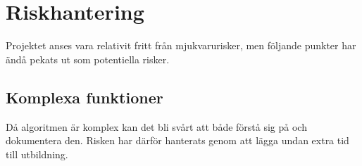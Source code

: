 \section{Riskhantering}
Projektet anses vara relativit fritt från mjukvarurisker, men följande punkter har ändå pekats ut som potentiella risker. 
\subsection{Komplexa funktioner}
Då algoritmen är komplex kan det bli svårt att både förstå sig på och dokumentera den. Risken har därför hanterats genom att lägga undan extra tid till utbildning.

\subsection{}